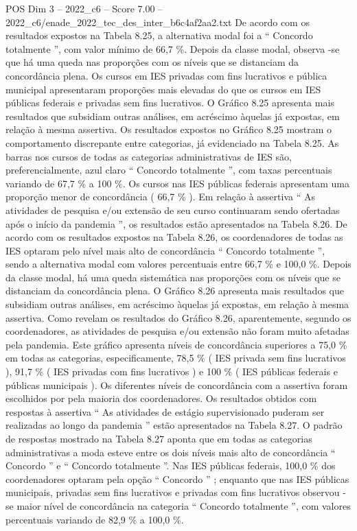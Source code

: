 \begin{textsample}{POS Dim 3 – 2022\_c6 – Score 7.00 – 2022\_c6/enade\_2022\_tec\_des\_inter\_b6c4af2aa2.txt}
De acordo com os resultados expostos na Tabela 8.25, a alternativa modal foi a “ Concordo totalmente ”, com valor mínimo de 66,7 \%.
Depois da classe modal, observa -se que há uma queda nas proporções com os níveis que se distanciam da concordância plena.
Os cursos em IES privadas com fins lucrativos e pública municipal apresentaram proporções mais elevadas do que os cursos em IES públicas federais e privadas sem fins lucrativos.
O Gráfico 8.25 apresenta mais resultados que subsidiam outras análises, em acréscimo àquelas já expostas, em relação à mesma assertiva.
Os resultados expostos no Gráfico 8.25 mostram o comportamento discrepante entre categorias, já evidenciado na Tabela 8.25.
As barras nos cursos de todas as categorias administrativas de IES são, preferencialmente, azul claro “ Concordo totalmente ”, com taxas percentuais variando de 67,7 \% a 100 \%.
Os cursos nas IES públicas federais apresentam uma proporção menor de concordância ( 66,7 \% ).
Em relação à assertiva “ As atividades de pesquisa e/ou extensão de seu curso continuaram sendo ofertadas após o início da pandemia ”, os resultados estão apresentados na Tabela 8.26.
De acordo com os resultados expostos na Tabela 8.26, os coordenadores de todas as IES optaram pelo nível mais alto de concordância “ Concordo totalmente ”, sendo a alternativa modal com valores percentuais entre 66,7 \% e 100,0 \%.
Depois da classe modal, há uma queda sistemática nas proporções com os níveis que se distanciam da concordância plena.
O Gráfico 8.26 apresenta mais resultados que subsidiam outras análises, em acréscimo àquelas já expostas, em relação à mesma assertiva.
Como revelam os resultados do Gráfico 8.26, aparentemente, segundo os coordenadores, as atividades de pesquisa e/ou extensão não foram muito afetadas pela pandemia.
Este gráfico apresenta níveis de concordância superiores a 75,0 \% em todas as categorias, especificamente, 78,5 \% ( IES privada sem fins lucrativos ), 91,7 \% ( IES privadas com fins lucrativos ) e 100 \% ( IES públicas federais e públicas municipais ).
Os diferentes níveis de concordância com a assertiva foram escolhidos por pela maioria dos coordenadores.
Os resultados obtidos com respostas à assertiva “ As atividades de estágio supervisionado puderam ser realizadas ao longo da pandemia ” estão apresentados na Tabela 8.27.
O padrão de respostas mostrado na Tabela 8.27 aponta que em todas as categorias administrativas a moda esteve entre os dois níveis mais alto de concordância “ Concordo ” e “ Concordo totalmente ”.
Nas IES públicas federais, 100,0 \% dos coordenadores optaram pela opção “ Concordo ” ; enquanto que nas IES públicas municipais, privadas sem fins lucrativos e privadas com fins lucrativos observou -se maior nível de concordância na categoria “ Concordo totalmente ”, com valores percentuais variando de 82,9 \% a 100,0 \%.

\end{textsample}
